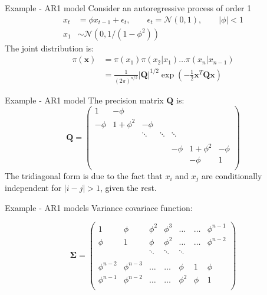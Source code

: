 \documentclass[
  ignorenonframetext,
]{beamer}
\begin{document}
\begin{frame}{Example - AR1 model}
\protect\hypertarget{example---ar1-model}{}
Consider an autoregressive process of order 1 \[
\begin{aligned}
x_t &= \phi x_{t-1} + \epsilon_t, \qquad \epsilon_t = \mathcal{N}(0,1),\qquad|\phi|<1\\
x_1&\sim\mathcal{N}(0, 1/(1-\phi^2))
\end{aligned}
\] The joint distribution is: \[
\begin{aligned}
\pi(\mathbf{x}) & =  \pi(x_1)\pi(x_2|x_1)\dots\pi(x_n|x_{n-1})\\
 & = \frac{1}{(2\pi)^{n/2}}|\mathbf{Q}|^{1/2}\exp\left(-\frac{1}{2}\mathbf{x}^T\mathbf{Qx}\right)
\end{aligned}
\]
\end{frame}

\begin{frame}{Example - AR1 model}
\protect\hypertarget{example---ar1-model-1}{}
The precision matrix \(\mathbf{Q}\) is: \[
\mathbf{Q} =
\left(
  \begin{array}{ccccccc}
 1 & -\phi & & & & &\\
 -\phi & 1+\phi^2 & -\phi &&&& \\
  & & \ddots&\ddots&\ddots&&\\
 &&&&&&\\
 &&&&-\phi&1+\phi^2&-\phi\\
 &&&&&-\phi&1\\
\end{array} \right)
\] \pause The tridiagonal form is due to the fact that \(x_i\) and
\(x_j\) are conditionally independent for \(|i-j|>1\), given the rest.
\end{frame}

\begin{frame}{Example - AR1 models}
\protect\hypertarget{example---ar1-models}{}
Variance covariace function:

\[
\mathbf{\Sigma} =
\left(
  \begin{array}{ccccccc}
 1 & \phi & \phi^2& \phi^3&\dots & \dots& \phi^{n-1}\\
 \phi & 1 & \phi &\phi^2&\dots&\dots&\phi^{n-2} \\
  & & \ddots&\ddots&\ddots&&\\
 &&&&&&\\
 \phi^{n-2}&\phi^{n-3}&\dots&\dots&\phi&1&\phi\\
 \phi^{n-1}&\phi^{n-2}&\dots&\dots&\phi^2&\phi&1\\
\end{array} \right)
\]
\end{frame}
\end{document}
